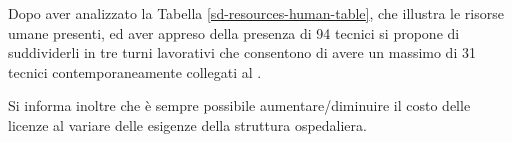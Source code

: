 Dopo aver analizzato la Tabella \ref{sd-resources-human-table}, che illustra le risorse umane presenti, ed aver appreso della presenza di \num{94} tecnici si propone di suddividerli in tre turni lavorativi che consentono di avere un massimo di \num{31} tecnici contemporaneamente collegati al . 

Si informa inoltre che è sempre possibile aumentare/diminuire il costo delle licenze al variare delle esigenze della struttura ospedaliera.